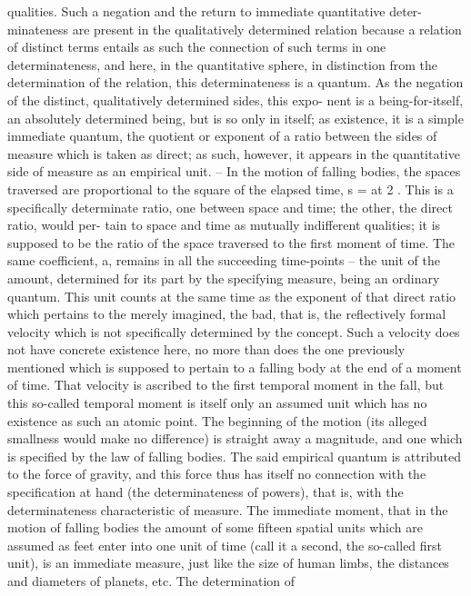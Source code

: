 qualities. Such a negation and the return to immediate quantitative deter-
minateness are present in the qualitatively determined relation because a
relation of distinct terms entails as such the connection of such terms in
one determinateness, and here, in the quantitative sphere, in distinction
from the determination of the relation, this determinateness is a quantum.
As the negation of the distinct, qualitatively determined sides, this expo-
nent is a being-for-itself, an absolutely determined being, but is so only
in itself; as existence, it is a simple immediate quantum, the quotient or
exponent of a ratio between the sides of measure which is taken as direct; as
such, however, it appears in the quantitative side of measure as an empirical
unit. – In the motion of falling bodies, the spaces traversed are proportional
to the square of the elapsed time, s = at 2 . This is a specifically determinate
ratio, one between space and time; the other, the direct ratio, would per-
tain to space and time as mutually indifferent qualities; it is supposed
to be the ratio of the space traversed to the first moment of time. The
same coefficient, a, remains in all the succeeding time-points – the unit
of the amount, determined for its part by the specifying measure, being
an ordinary quantum. This unit counts at the same time as the exponent
of that direct ratio which pertains to the merely imagined, the bad, that is,
the reflectively formal velocity which is not specifically determined by the
concept. Such a velocity does not have concrete existence here, no more
than does the one previously mentioned which is supposed to pertain to a
falling body at the end of a moment of time. That velocity is ascribed to
the first temporal moment in the fall, but this so-called temporal moment
is itself only an assumed unit which has no existence as such an atomic
point. The beginning of the motion (its alleged smallness would make
no difference) is straight away a magnitude, and one which is specified
by the law of falling bodies. The said empirical quantum is attributed to
the force of gravity, and this force thus has itself no connection with the
specification at hand (the determinateness of powers), that is, with the
determinateness characteristic of measure. The immediate moment, that
in the motion of falling bodies the amount of some fifteen spatial units
which are assumed as feet enter into one unit of time (call it a second, the
so-called first unit), is an immediate measure, just like the size of human
limbs, the distances and diameters of planets, etc. The determination of
